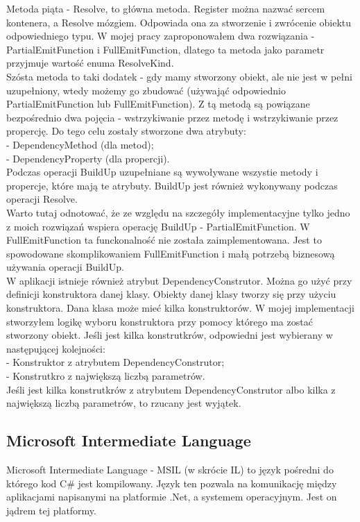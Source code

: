 \documentclass[12pt]{article}
\begin{document}
Metoda piąta - Resolve, to główna metoda. Register można nazwać sercem kontenera, a Resolve mózgiem. Odpowiada ona za stworzenie i zwrócenie obiektu odpowiedniego typu. W mojej pracy zaproponowałem dwa rozwiązania - PartialEmitFunction i FullEmitFunction, dlatego ta metoda jako parametr przyjmuje wartość enuma ResolveKind.\\
Szósta metoda to taki dodatek - gdy mamy stworzony obiekt, ale nie jest w pełni uzupełniony, wtedy możemy go zbudować (używająć odpowiednio PartialEmitFunction lub FullEmitFunction). Z tą metodą są powiązane bezpośrednio dwa pojęcia - wstrzykiwanie przez metodę i wstrzykiwanie przez propercję. Do tego celu zostały stworzone dwa atrybuty:\\
- DependencyMethod (dla metod);\\
- DependencyProperty (dla propercji).\\
Podczas operacji BuildUp uzupełniane są wywoływane wszystie metody i propercje, które mają te atrybuty. BuildUp jest również wykonywany podczas operacji Resolve.\\
Warto tutaj odnotować, że ze względu na szczegóły implementacyjne tylko jedno z moich rozwiązań wspiera operację BuildUp - PartialEmitFunction. W FullEmitFunction ta funckonalność nie została zaimplementowana. Jest to spowodowane skomplikowaniem FullEmitFunction i małą potrzebą biznesową używania operacji BuildUp.\\

W aplikacji istnieje również atrybut DependencyConstrutor. Można go użyć przy definicji konstruktora danej klasy. Obiekty danej klasy tworzy się przy użyciu konstruktora. Dana klasa może mieć kilka konstruktorów. W mojej implementacji stworzyłem logikę wyboru konstruktora przy pomocy którego ma zostać stworzony obiekt. Jeśli jest kilka konstrutkrów, odpowiedni jest wybierany w następującej kolejności:\\
- Konstruktor z atrybutem DependencyConstrutor;\\
- Konstrutkro z największą liczbą parametrów.\\
Jeśli jest kilka konstrutkrów z atrybutem DependencyConstrutor albo kilka z największą liczbą parametrów, to rzucany jest wyjątek.\\

\subsection{Microsoft Intermediate Language}
Microsoft Intermediate Language - MSIL (w skrócie IL) to język pośredni do którego kod C\# jest kompilowany. Język ten pozwala na komunikację między aplikacjami napisanymi na platformie .Net, a systemem operacyjnym. Jest on jądrem tej platformy.
\end{document}
